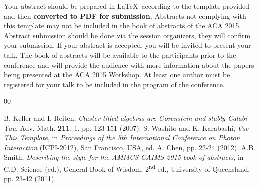 \documentclass[11pt]{article}
\begin{document}
Your abstract should be prepared in \LaTeX\ according to the template provided  and then \textbf{converted to PDF for submission.}   Abstracts not complying with this template may not be included in the book of abstracts of the ACA 2015. Abstract submission should be done  via the session organizers, they will confirm your submission. If your abstract is accepted, you will be invited to present your talk.
The book of abstracts will be available to the participants prior to the conference and will provide the audience with more information
about the papers being presented at the ACA 2015 Workshop. At least one author must be registered for your talk to be included in the program of the conference.



\begin{thebibliography}{00}
\setlength{\itemsep}{-1mm}
\footnotesize
{} B. Keller and I. Reiten, \textit{Cluster-titled algebras are Gorenstein and stably Calabi-Yau}, Adv. Math. \textbf{211}, 1, pp. 123-151 (2007).
 S. Washito and K. Karabashi, \textit{Use This Template}, in \textit{Proceedings of the 5th
International Conference on Photon Interaction} (ICPI-2012), San Francisco, USA, ed. A. Chen, pp. 22-24 (2012).
 A.B. Smith, \textit{Describing the style for the AMMCS-CAIMS-2015 book of abstracts}, in C.D. Science (ed.), General Book of Wisdom, 2\textsuperscript{nd} ed., University of Queensland, pp. 23-42 (2011).
\end{thebibliography}
\normalsize
\end{document}
